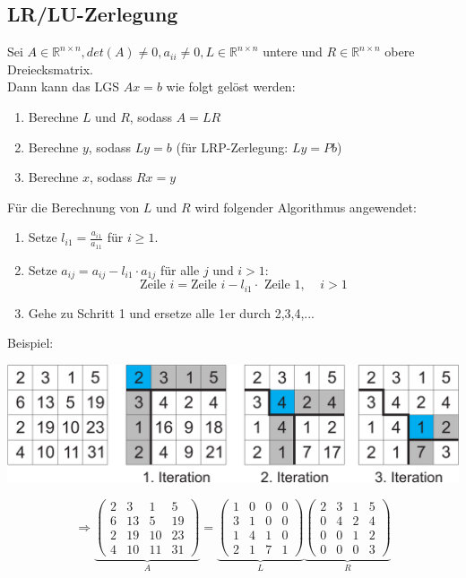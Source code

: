 \documentclass[4pt,a4paper]{scrartcl}
\begin{document}
\begin{multicols}{4}
\subsection{LR/LU-Zerlegung}
Sei $A\in\mathbb{R}^{n\times n}, det(A)\neq 0,a_{ii}\neq 0, L\in\mathbb{R}^{n\times n}$ untere und $R\in\mathbb{R}^{n\times n}$ obere Dreiecksmatrix.\\
Dann kann das LGS $Ax=b$ wie folgt gelöst werden:
\begin{enumerate}
\item Berechne $L$ und $R$, sodass $A=LR$
\item Berechne $y$, sodass $Ly=b$ (für LRP-Zerlegung: $Ly=Pb$)
\item Berechne $x$, sodass $Rx=y$
\end{enumerate}
Für die Berechnung von $L$ und $R$ wird folgender Algorithmus angewendet:
\begin{enumerate}
\item Setze $l_{i1}=\frac{a_{i1}}{a_{11}}$ für $i\geq 1$.
\item Setze $a_{ij}=a_{ij}-l_{i1}\cdot a_{1j}$ für alle $j$ und $i>1$:
\begin{equation*}
\text{Zeile }i=\text{Zeile }i-l_{i1}\cdot \text{ Zeile }1,\;\;\;\;i>1
\end{equation*}
\item Gehe zu Schritt 1 und ersetze alle 1er durch 2,3,4,...
\end{enumerate}
\vspace{0.3cm}
Beispiel:
\begin{center}
\includegraphics[width=0.95\columnwidth]{Grafiken/LU-Zerlegung}
\end{center}
\begin{equation*}
\Rightarrow\underbrace{\begin{pmatrix}2 & 3 & 1 & 5 \\ 6 & 13 & 5 & 19 \\ 2 & 19 & 10 & 23 \\ 4 & 10 & 11 & 31\end{pmatrix}}_{A}=\underbrace{\begin{pmatrix}1 & 0 & 0 & 0 \\ 3 & 1 & 0 & 0 \\ 1 & 4 & 1 & 0 \\ 2 & 1 & 7 & 1\end{pmatrix}}_{L}\underbrace{\begin{pmatrix}2 & 3 & 1 & 5 \\ 0 & 4 & 2 & 4 \\ 0 & 0 & 1 & 2 \\ 0 & 0 & 0 & 3\end{pmatrix}}_{R}

\end{equation*}
\end{multicols}
\end{document}
